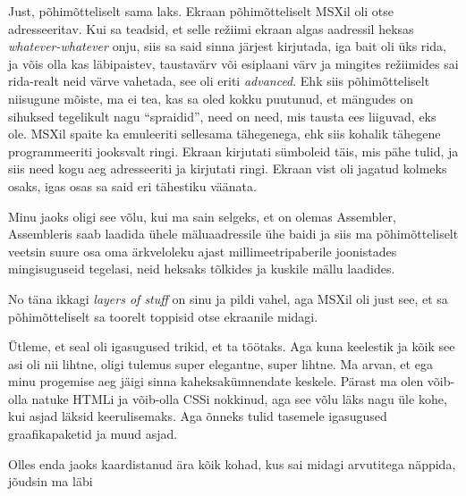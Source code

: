 Just, põhimõtteliselt sama laks. Ekraan põhimõtteliselt MSXil oli otse adresseeritav. Kui sa teadsid, et selle režiimi ekraan algas aadressil heksas \emph{whatever-whatever} onju, siis sa said sinna järjest kirjutada, iga bait oli üks rida, ja võis olla kas  läbipaistev, taustavärv või esiplaani värv ja mingites režiimides sai rida-realt neid värve vahetada, see oli eriti \emph{advanced}. Ehk siis põhimõtteliselt niisugune mõiste, ma ei tea, kas sa oled kokku puutunud, et mängudes on sihuksed tegelikult nagu \enquote{spraidid}, need on need, mis tausta ees liiguvad, eks ole. MSXil spaite ka emuleeriti sellesama tähegenega, ehk siis kohalik tähegene programmeeriti jooksvalt ringi. Ekraan kirjutati sümboleid täis, mis  pähe tulid, ja siis need kogu aeg adresseeriti ja kirjutati ringi. Ekraan vist oli jagatud kolmeks osaks, igas osas sa said eri tähestiku väänata.

Minu jaoks oligi see võlu, kui ma sain selgeks, et on olemas Assembler, Assembleris saab laadida ühele mäluaadressile ühe baidi ja siis ma põhimõtteliselt veetsin suure osa oma ärkveloleku ajast millimeetripaberile joonistades mingisuguseid tegelasi, neid heksaks tõlkides ja kuskile mällu laadides. 


No täna ikkagi \emph{layers of stuff} on sinu ja pildi vahel, aga MSXil oli just see, et sa põhimõtteliselt sa toorelt toppisid otse ekraanile midagi. 


Ütleme, et seal oli igasugused trikid, et ta töötaks. Aga kuna keelestik ja kõik see asi oli nii lihtne, oligi tulemus super elegantne, super  lihtne.  Ma arvan, et ega minu progemise aeg jäigi sinna kaheksakümnendate keskele. Pärast ma olen võib-olla natuke HTMLi ja võib-olla CSSi nokkinud, aga see võlu läks nagu üle kohe, kui asjad läksid keerulisemaks. Aga õnneks tulid tasemele igasugused graafikapaketid ja muud asjad. 


Olles enda jaoks kaardistanud ära kõik kohad, kus sai midagi arvutitega näppida, jõudsin ma läbi

